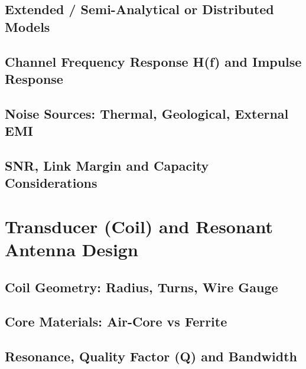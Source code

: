 \subsection{Extended / Semi-Analytical or Distributed Models}\label{subsec:extended-models}

\subsection{Channel Frequency Response H(f) and Impulse Response}\label{subsec:channel-response}

\subsection{Noise Sources: Thermal, Geological, External EMI}\label{subsec:noise-sources}

\subsection{SNR, Link Margin and Capacity Considerations}\label{subsec:snr-capacity}

\section{Transducer (Coil) and Resonant Antenna Design}\label{sec:coil-design}
\subsection{Coil Geometry: Radius, Turns, Wire Gauge}\label{subsec:coil-geometry}

\subsection{Core Materials: Air-Core vs Ferrite}\label{subsec:core-materials}

\subsection{Resonance, Quality Factor (Q) and Bandwidth}\label{subsec:q-bandwidth}

